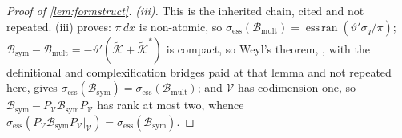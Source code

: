 \begin{proof}[Proof of \cref{lem:formstruct}]
\emph{(iii).} This is the inherited chain, cited and not repeated.
(iii) proves: $\pi\,dx$ is non-atomic, so
$\sigma_{\mathrm{ess}}(\mathcal B_{\mathrm{mult}})=\operatorname{ess\,ran}(\vartheta'\sigma_q/\pi)$;
$\mathcal B_{\mathrm{sym}}-\mathcal B_{\mathrm{mult}}=-\vartheta'(\tilde{\mathcal K}+\tilde{\mathcal K}^{\ast})$
is compact, so Weyl's theorem, \citet[Thm.~IV.5.35]{kato1995}, with the definitional and
complexification bridges paid at that lemma and not repeated here, gives
$\sigma_{\mathrm{ess}}(\mathcal B_{\mathrm{sym}})=\sigma_{\mathrm{ess}}(\mathcal B_{\mathrm{mult}})$; and
$\mathcal V$ has codimension one, so
$\mathcal B_{\mathrm{sym}}-P_{\mathcal V}\mathcal B_{\mathrm{sym}}P_{\mathcal V}$ has rank at most two,
whence
$\sigma_{\mathrm{ess}}(P_{\mathcal V}\mathcal B_{\mathrm{sym}}P_{\mathcal V}|_{\mathcal V})
=\sigma_{\mathrm{ess}}(\mathcal B_{\mathrm{sym}})$.

\end{proof}
